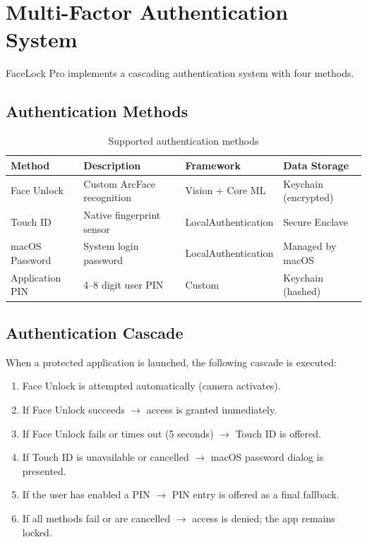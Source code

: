\documentclass[12pt,a4paper]{report}
\begin{document}
\section{Multi-Factor Authentication System}
FaceLock Pro implements a cascading authentication system with four methods.

\subsection{Authentication Methods}

\begin{table}[H]
\centering
\begin{tabularx}{\textwidth}{lXll}
\toprule
\textbf{Method} & \textbf{Description} & \textbf{Framework} & \textbf{Data Storage} \\
\midrule
Face Unlock & Custom ArcFace recognition & Vision + Core ML & Keychain (encrypted) \\
Touch ID & Native fingerprint sensor & LocalAuthentication & Secure Enclave \\
macOS Password & System login password & LocalAuthentication & Managed by macOS \\
Application PIN & 4--8 digit user PIN & Custom & Keychain (hashed) \\
\bottomrule
\end{tabularx}
\caption{Supported authentication methods}
\end{table}

\subsection{Authentication Cascade}
When a protected application is launched, the following cascade is executed:

\begin{enumerate}
    \item Face Unlock is attempted automatically (camera activates).
    \item If Face Unlock succeeds $\rightarrow$ access is granted immediately.
    \item If Face Unlock fails or times out (5 seconds) $\rightarrow$ Touch ID is offered.
    \item If Touch ID is unavailable or cancelled $\rightarrow$ macOS password dialog is presented.
    \item If the user has enabled a PIN $\rightarrow$ PIN entry is offered as a final fallback.
    \item If all methods fail or are cancelled $\rightarrow$ access is denied; the app remains locked.
\end{enumerate}
\end{document}
